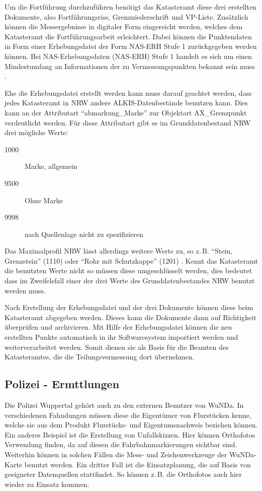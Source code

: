 Um die Fortführung durchzuführen benötigt das Katasteramt diese drei erstellten Dokumente, also Fortführungsriss, Grenzniederschrift und \ac{VP-Liste}.
Zusätzlich können die Messergebnisse in digitaler Form eingereicht werden, welches dem Katasteramt die Fortführungsarbeit erleichtert. Dabei können die Punktendaten in Form einer Erhebungsdatei der Form NAS-ERH Stufe 1 zurückgegeben werden können.
Bei NAS-Erhebungsdaten (NAS-ERH) Stufe 1 handelt es sich um einen Mindestumfang an Informationen der zu Vermessungspunkten bekannt sein muss \autocite[vgl.][]{bezk-nas-erh}.

Ehe die Erhebungsdatei erstellt werden kann muss darauf geachtet werden, dass jedes Katasteramt in \ac{NRW} andere ALKIS-Datenbestände benutzen kann. Dies kann an der Attributart "`abmarkung\_Marke"' zur Objektart AX\_Grenzpunkt verdeutlicht werden. Für diese Attributart gibt es im  Grunddatenbestand NRW drei mögliche Werte:
\begin{description}
\item[1000] Marke, allgemein
\item[9500] Ohne Marke
\item[9998] nach Quellenlage nicht zu spezifizieren 
\end{description}
Das Maximalprofil NRW lässt allerdings weitere Werte zu, so z.\,B. "`Stein, Grenzstein"' (1110) oder "`Rohr mit Schutzkappe"' (1201) \autocite[vgl.][]{bezk-schluessel}. Kennt das Katasteramt die benutzten Werte nicht so müssen diese umgeschlüsselt werden, dies bedeutet dass im Zweifelsfall einer der drei Werte des Grunddatenbestandes NRW benutzt werden muss. 

Nach Erstellung der Erhebungsdatei und der drei Dokumente können diese beim Katasteramt abgegeben werden. Dieses kann die Dokumente dann auf Richtigkeit überprüfen und archivieren.
Mit Hilfe der Erhebungsdatei können die neu erstellten Punkte automatisch in ihr Softwaresystem importiert werden und weiterverarbeitet werden.
Somit dienen sie als Basis für die Beamten des Katasteramtes, die die Teilungsvermessung dort übernehmen.

\subsection{Polizei - Ermttlungen} \label{subsec:polizei_ermittlung}
Die Polizei Wuppertal gehört auch zu den externen Benutzer von \ac{WuNDa}.
In verschiedenen Fahndungen müssen diese die Eigentümer von Flurstücken kenne, welche sie aus dem Produkt Flurstücks- und Eigentumsnachweis beziehen können.
Ein anderes Beispiel ist die Erstellung von Unfallskizzen. Hier können Orthofotos Verwendung finden, da auf diesen die Fahrbahnmarkierungen sichtbar sind. Weiterhin können in solchen Fällen die Mess- und Zeichenwerkzeuge der \ac{WuNDa}-Karte benutzt werden.
Ein dritter Fall ist die Einsatzplanung, die auf Basis von geeigneter Datenquellen stattfindet. So können z.\,B. die Orthofotos auch hier wieder zu Einsatz kommen.

